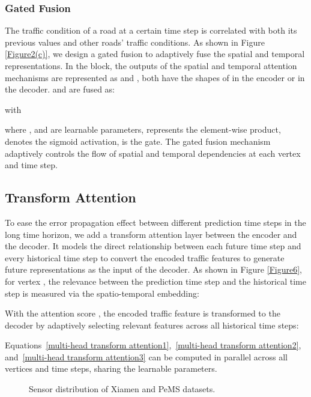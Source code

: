 \documentclass[letterpaper]{article} \usepackage{aaai20}  \usepackage{times}  \usepackage{helvet} \usepackage{courier}  \usepackage[hyphens]{url}  \usepackage{graphicx} \usepackage{amsmath}
\begin{document}
\subsubsection{Gated Fusion}

The traffic condition of a road at a certain time step is correlated with both its previous values and other roads' traffic conditions. As shown in Figure \ref{Figure2(c)}, we design a gated fusion to adaptively fuse the spatial and temporal representations. In the  block, the outputs of the spatial and temporal attention mechanisms are represented as  and , both have the shapes of  in the encoder or  in the decoder.  and  are fused as:

with

where ,  and  are learnable parameters,  represents the element-wise product,  denotes the sigmoid activation,  is the gate. The gated fusion mechanism adaptively controls the flow of spatial and temporal dependencies at each vertex and time step.  

\subsection{Transform Attention}

To ease the error propagation effect between different prediction time steps in the long time horizon, we add a transform attention layer between the encoder and the decoder. It models the direct relationship between each future time step and every historical time step to convert the encoded traffic features to generate future representations as the input of the decoder. As shown in Figure \ref{Figure6}, for vertex , the relevance between the prediction time step  and the historical time step  is measured via the spatio-temporal embedding:


With the attention score , the encoded traffic feature is transformed to the decoder by adaptively selecting relevant features across all historical  time steps:

Equations~\ref{multi-head transform attention1},~\ref{multi-head transform attention2}, and~\ref{multi-head transform attention3} can be computed in parallel across all vertices and time steps, sharing the learnable parameters.

\begin{figure}
	\centering
	\caption{Sensor distribution of Xiamen and PeMS datasets.}
	\label{Figure7} 
\end{figure}
\end{document}
